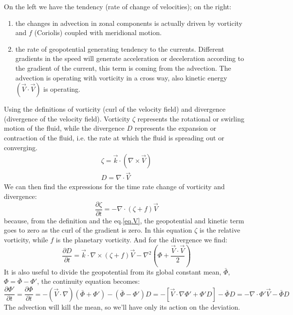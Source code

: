 On the left we have the tendency (rate of change of velocities); on the right:
\begin{enumerate}
	\item the changes in advection in zonal components is actually driven by vorticity and $f$ (Coriolis) coupled with meridional motion.
	\item the rate of geopotential generating tendency to the currents. Different gradients in the speed will generate acceleration or deceleration according to the gradient of the current, this term is coming from the advection. The advection is operating with vorticity in a cross way, also kinetic energy $(\vec{V}\cdot\vec{V})$ is operating.
\end{enumerate}


Using the definitions of vorticity (curl of the velocity field) and divergence (divergence of the velocity field). Vorticity $\zeta$ represents the rotational or swirling motion of the fluid, while the divergence $D$ represents the expansion or contraction of the fluid, i.e. the rate at which the fluid is spreading out or converging.
\begin{align}\label{eq.defsvortdiv}
	\zeta=\vec{k}\cdot(\nabla\times \vec{V}) \\
	D=\nabla\cdot\vec{V}
\end{align}
We can then find the expressions for the time rate change of vorticity and divergence:
\begin{equation}\label{eq.for vorticity time change}
	\frac{\partial\zeta}{\partial t}=-\nabla\cdot(\zeta +f)\vec{V}
\end{equation}
because, from the definition and the eq.\ref{eq.V}, the geopotential and kinetic term goes to zero as the curl of the gradient is zero. In this equation $\zeta$ is the relative vorticity, while $f$ is the planetary vorticity. And for the divergence we find:
\begin{equation}\label{eq.for divergence time change}
	\frac{\partial D}{\partial t}=\vec{k}\cdot\nabla\times(\zeta+f)\vec{V}-\nabla^2\left(\Phi+\frac{\vec{V}\cdot\vec{V}}{2}\right)
\end{equation}
It is also useful to divide the geopotential from its global constant mean, $\bar{\Phi}$, $\Phi=\bar{\Phi}-\Phi'$, the continuity equation becomes:
$$\frac{\partial\Phi'}{\partial t}=\frac{\partial\Phi}{\partial t}=-(\vec{V}\cdot\nabla)(\bar{\Phi}+\Phi')-(\bar{\Phi}-\Phi')D=-[\vec{V}\cdot\nabla\Phi'+\Phi'D]-\bar{\Phi}D=-\nabla\cdot\Phi'\vec{V}-\bar{\Phi}D$$
The advection will kill the mean, so we'll have only its action on the deviation.

